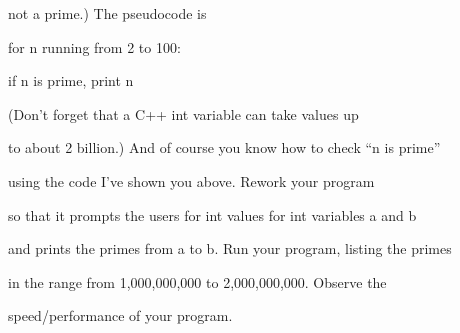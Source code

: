 not a prime.) The pseudocode is

\begin{console}

for n running from 2 to 100:

    if n is prime, print n

\end{console}

(Don't forget that a C++ int variable can take values up

to about 2 billion.) And of course you know how to check ``n is prime''

using the code I've shown you above. Rework your program

so that it prompts the users for int values for int variables a and b

and prints the primes from a to b. Run your program, listing the primes

in the range from 1,000,000,000 to 2,000,000,000. Observe the

speed/performance of your program.

